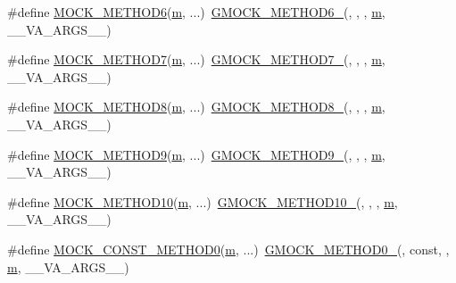 \begin{DoxyCompactItemize}
\item 
\#define \hyperlink{gmock-generated-function-mockers_8h_add8f8f786444c2c85ac67f550dbde5a6}{M\+O\+C\+K\+\_\+\+M\+E\+T\+H\+O\+D6}(\hyperlink{app_2main_8cpp_a0d2d8836216fc94b61aa0824eb239db2}{m}, ...)~\hyperlink{gmock-generated-function-mockers_8h_ad0ca7f6973a076d0af4c953f8ed91842}{G\+M\+O\+C\+K\+\_\+\+M\+E\+T\+H\+O\+D6\+\_\+}(, , , \hyperlink{app_2main_8cpp_a0d2d8836216fc94b61aa0824eb239db2}{m}, \+\_\+\+\_\+\+V\+A\+\_\+\+A\+R\+G\+S\+\_\+\+\_\+)
\item 
\#define \hyperlink{gmock-generated-function-mockers_8h_a01f3369877a0c52f59c006fbd54b6a10}{M\+O\+C\+K\+\_\+\+M\+E\+T\+H\+O\+D7}(\hyperlink{app_2main_8cpp_a0d2d8836216fc94b61aa0824eb239db2}{m}, ...)~\hyperlink{gmock-generated-function-mockers_8h_ab98a8399ba62b53b375c2807f4d39d2f}{G\+M\+O\+C\+K\+\_\+\+M\+E\+T\+H\+O\+D7\+\_\+}(, , , \hyperlink{app_2main_8cpp_a0d2d8836216fc94b61aa0824eb239db2}{m}, \+\_\+\+\_\+\+V\+A\+\_\+\+A\+R\+G\+S\+\_\+\+\_\+)
\item 
\#define \hyperlink{gmock-generated-function-mockers_8h_ae77220bef9ab254c331b9026a3d18dba}{M\+O\+C\+K\+\_\+\+M\+E\+T\+H\+O\+D8}(\hyperlink{app_2main_8cpp_a0d2d8836216fc94b61aa0824eb239db2}{m}, ...)~\hyperlink{gmock-generated-function-mockers_8h_aa84a36427c44505207b7cad5dec7ad67}{G\+M\+O\+C\+K\+\_\+\+M\+E\+T\+H\+O\+D8\+\_\+}(, , , \hyperlink{app_2main_8cpp_a0d2d8836216fc94b61aa0824eb239db2}{m}, \+\_\+\+\_\+\+V\+A\+\_\+\+A\+R\+G\+S\+\_\+\+\_\+)
\item 
\#define \hyperlink{gmock-generated-function-mockers_8h_ad6b30841fe780994d216cc8829cc127f}{M\+O\+C\+K\+\_\+\+M\+E\+T\+H\+O\+D9}(\hyperlink{app_2main_8cpp_a0d2d8836216fc94b61aa0824eb239db2}{m}, ...)~\hyperlink{gmock-generated-function-mockers_8h_aa820171a19cc587c247dbe05cbffc55f}{G\+M\+O\+C\+K\+\_\+\+M\+E\+T\+H\+O\+D9\+\_\+}(, , , \hyperlink{app_2main_8cpp_a0d2d8836216fc94b61aa0824eb239db2}{m}, \+\_\+\+\_\+\+V\+A\+\_\+\+A\+R\+G\+S\+\_\+\+\_\+)
\item 
\#define \hyperlink{gmock-generated-function-mockers_8h_a01760fdd295f5a92264eed6a9ff1dbf8}{M\+O\+C\+K\+\_\+\+M\+E\+T\+H\+O\+D10}(\hyperlink{app_2main_8cpp_a0d2d8836216fc94b61aa0824eb239db2}{m}, ...)~\hyperlink{gmock-generated-function-mockers_8h_a81a48223a8771de36ef92ac6d56f6e81}{G\+M\+O\+C\+K\+\_\+\+M\+E\+T\+H\+O\+D10\+\_\+}(, , , \hyperlink{app_2main_8cpp_a0d2d8836216fc94b61aa0824eb239db2}{m}, \+\_\+\+\_\+\+V\+A\+\_\+\+A\+R\+G\+S\+\_\+\+\_\+)
\item 
\#define \hyperlink{gmock-generated-function-mockers_8h_ac86e04e649fa8bf35b5f0149a13c935d}{M\+O\+C\+K\+\_\+\+C\+O\+N\+S\+T\+\_\+\+M\+E\+T\+H\+O\+D0}(\hyperlink{app_2main_8cpp_a0d2d8836216fc94b61aa0824eb239db2}{m}, ...)~\hyperlink{gmock-generated-function-mockers_8h_ae0d290ffa58d7c624b2e3487ba1252f4}{G\+M\+O\+C\+K\+\_\+\+M\+E\+T\+H\+O\+D0\+\_\+}(, const, , \hyperlink{app_2main_8cpp_a0d2d8836216fc94b61aa0824eb239db2}{m}, \+\_\+\+\_\+\+V\+A\+\_\+\+A\+R\+G\+S\+\_\+\+\_\+)

\end{DoxyCompactItemize}
